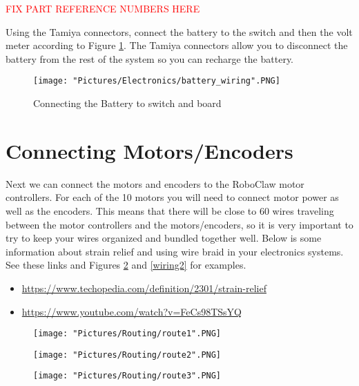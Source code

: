 \documentclass[12pt]{article}
\begin{document}
\textcolor{red}{FIX PART REFERENCE NUMBERS HERE}

\noindent Using the Tamiya connectors, connect the battery to the switch and then the volt meter according to Figure \ref{battery_wiring}. The Tamiya connectors allow you to disconnect the battery from the rest of the system so you can recharge the battery. 


\begin{figure}[H]
  	\centering
    	\texttt{[image: "Pictures/Electronics/battery\_wiring".PNG]}
 	\caption{Connecting the Battery to switch and board}
	\label{battery_wiring}
\end{figure}


\section{Connecting Motors/Encoders}

Next we can connect the motors and encoders to the RoboClaw motor controllers. For each of the 10 motors you will need to connect motor power as well as the encoders. This means that there will be close to 60 wires traveling between the motor controllers and the motors/encoders, so it is very important to try to keep your wires organized and bundled together well. Below is some information about strain relief and using wire braid in your electronics systems.  See these links and Figures \ref{wiring1} and \ref{wiring2} for examples.

\begin{itemize}
	\item \href{https://www.techopedia.com/definition/2301/strain-relief}{https://www.techopedia.com/definition/2301/strain-relief}
	\item \href{https://www.youtube.com/watch?v=FeCs98TSsYQ}{https://www.youtube.com/watch?v=FeCs98TSsYQ}
\end{itemize}


\begin{figure}[H]
  	\centering
  	\begin{minipage}[b]{0.34\textwidth}
    		\texttt{[image: "Pictures/Routing/route1".PNG]}
  	\end{minipage}
  	\hfill
  	\begin{minipage}[b]{0.29\textwidth}
    		\texttt{[image: "Pictures/Routing/route2".PNG]}
  	\end{minipage}
    	\hfill
  	\begin{minipage}[b]{0.30\textwidth}
    		\texttt{[image: "Pictures/Routing/route3".PNG]}
  	\end{minipage}
  	\caption{}
	\label{wiring1}
\end{figure}
\end{document}
